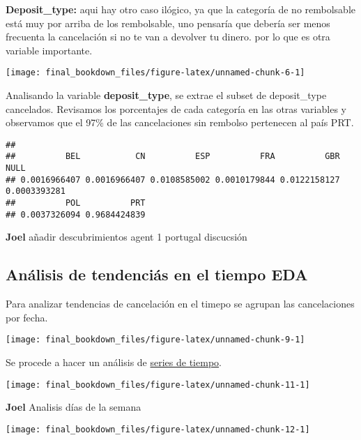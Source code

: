\documentclass[
]{book}
\begin{document}
\textbf{Deposit\_type:} aqui hay otro caso ilógico, ya que la categoría de no rembolsable está muy por arriba de los rembolsable, uno pensaría que debería ser menos frecuenta la cancelación si no te van a devolver tu dinero. por lo que es otra variable importante.

\begin{center}\texttt{[image: final\_bookdown\_files/figure-latex/unnamed-chunk-6-1]} \end{center}

Analisando la variable \textbf{deposit\_type}, se extrae el subset de deposit\_type cancelados. Revisamos los porcentajes de cada categoría en las otras variables y observamos que el 97\% de las cancelaciones sin rembolso pertenecen al país PRT.

\begin{verbatim}
## 
##          BEL           CN          ESP          FRA          GBR         NULL 
## 0.0016966407 0.0016966407 0.0108585002 0.0010179844 0.0122158127 0.0003393281 
##          POL          PRT 
## 0.0037326094 0.9684424839
\end{verbatim}

\textbf{Joel} añadir descubrimientos agent 1 portugal discucsión

\hypertarget{anuxe1lisis-de-tendenciuxe1s-en-el-tiempo-eda}{%
\subsection{Análisis de tendenciás en el tiempo EDA}\label{anuxe1lisis-de-tendenciuxe1s-en-el-tiempo-eda}}

Para analizar tendencias de cancelación en el timepo se agrupan las cancelaciones por fecha.

\begin{center}\texttt{[image: final\_bookdown\_files/figure-latex/unnamed-chunk-9-1]} \end{center}

Se procede a hacer un análisis de \href{https://es.wikipedia.org/wiki/Serie_temporal}{series de tiempo}.

\begin{center}\texttt{[image: final\_bookdown\_files/figure-latex/unnamed-chunk-11-1]} \end{center}

\textbf{Joel} Analisis días de la semana

\begin{center}\texttt{[image: final\_bookdown\_files/figure-latex/unnamed-chunk-12-1]} \end{center}
\end{document}
